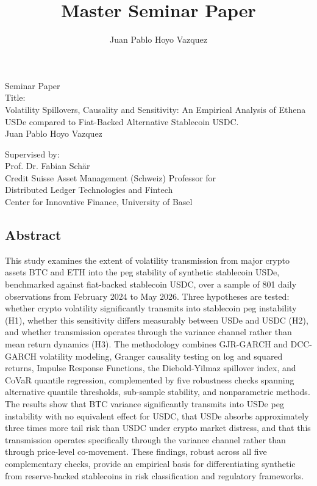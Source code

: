 \documentclass[12pt,a4paper,titlepage,oneside,english]{article}
\title{Master Seminar Paper}
\author{Juan Pablo Hoyo Vazquez}
\begin{document}
\begin{center}
\vspace{1em}
\large{Seminar Paper}\\
\huge Title:\\ Volatility Spillovers, Causality and Sensitivity: An
Empirical Analysis of Ethena USDe compared to
Fiat-Backed Alternative Stablecoin USDC. \\
\Large \vspace{1em}
Juan Pablo Hoyo Vazquez

\end{center}

\vspace{1em}
\normalsize
\begin{flushleft}
Supervised by:\\ 
Prof. Dr. Fabian Schär \\
Credit Suisse Asset Management (Schweiz) Professor for \\ 
Distributed Ledger Technologies and Fintech \\
Center for Innovative Finance, University of Basel
\end{flushleft}
\newpage
\vspace{1em}
\onehalfspacing
\begin{center}
\section*{Abstract}
\end{center}
This study examines the extent of volatility transmission from major crypto assets BTC and ETH into the peg stability of synthetic stablecoin USDe, benchmarked against fiat-backed stablecoin USDC, over a sample of 801 daily observations from February 2024 to May 2026. Three hypotheses are tested: whether crypto volatility significantly transmits into stablecoin peg instability (H1), whether this sensitivity differs measurably between USDe and USDC (H2), and whether transmission operates through the variance channel rather than mean return dynamics (H3). The methodology combines GJR-GARCH and DCC-GARCH volatility modeling, Granger causality testing on log and squared returns, Impulse Response Functions, the Diebold-Yilmaz spillover index, and CoVaR quantile regression, complemented by five robustness checks spanning alternative quantile thresholds, sub-sample stability, and nonparametric methods. The results show that BTC variance significantly transmits into USDe peg instability with no equivalent effect for USDC, that USDe absorbs approximately three times more tail risk than USDC under crypto market distress, and that this transmission operates specifically through the variance channel rather than through price-level co-movement. These findings, robust across all five complementary checks, provide an empirical basis for differentiating synthetic from reserve-backed stablecoins in risk classification and regulatory frameworks.\\
\end{document}
